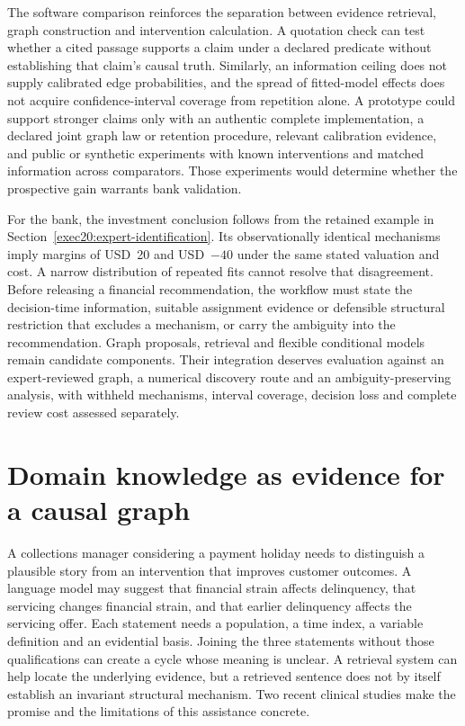 The software comparison reinforces the separation between evidence retrieval,
graph construction and intervention calculation. A quotation check can test
whether a cited passage supports a claim under a declared predicate without
establishing that claim's causal truth. Similarly, an information ceiling does
not supply calibrated edge probabilities, and the spread of fitted-model
effects does not acquire confidence-interval coverage from repetition alone.
A prototype could support stronger claims only with an authentic complete
implementation, a declared joint graph law or retention procedure, relevant
calibration evidence, and public or synthetic experiments with known
interventions and matched information across comparators. Those experiments
would determine whether the prospective gain warrants bank validation.

For the bank, the investment conclusion follows from the retained example in
Section~\ref{exec20:expert-identification}. Its observationally identical
mechanisms imply margins of USD~20 and USD~$-40$ under the same stated
valuation and cost. A narrow distribution of repeated fits cannot resolve
that disagreement. Before releasing a financial recommendation, the workflow
must state the decision-time information, suitable assignment evidence or
defensible structural restriction that excludes a mechanism, or carry the
ambiguity into the recommendation. Graph proposals, retrieval and flexible
conditional models remain candidate components. Their integration deserves
evaluation against an expert-reviewed graph, a numerical discovery route and
an ambiguity-preserving analysis, with withheld mechanisms, interval coverage,
decision loss and complete review cost assessed separately.


\section{Domain knowledge as evidence for a causal graph}
\label{exec22:domain-scope}

A collections manager considering a payment holiday needs to distinguish a
plausible story from an intervention that improves customer outcomes. A language
model may suggest that financial strain affects delinquency, that servicing
changes financial strain, and that earlier delinquency affects the servicing
offer. Each statement needs a population, a time index, a variable definition
and an evidential basis. Joining the three statements without those qualifications
can create a cycle whose meaning is unclear. A retrieval system can help locate
the underlying evidence, but a retrieved sentence does not by itself establish
an invariant structural mechanism. Two recent clinical studies make the promise
and the limitations of this assistance concrete.

